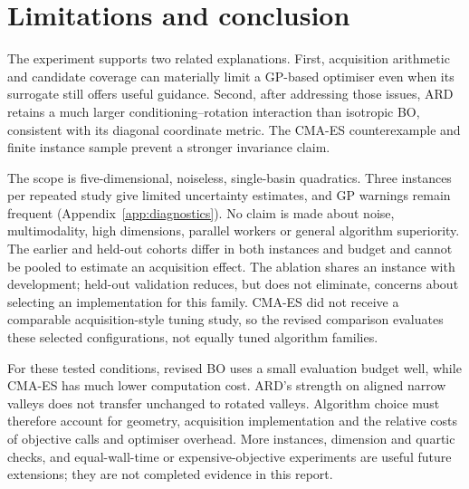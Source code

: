 \documentclass[12pt]{article}
\begin{document}
\section{Limitations and conclusion}
The experiment supports two related explanations. First, acquisition arithmetic
and candidate coverage can materially limit a GP-based optimiser even when
its surrogate still offers useful guidance. Second, after addressing those
issues, ARD retains a much larger conditioning--rotation interaction than
isotropic BO, consistent with its diagonal coordinate metric. The CMA-ES
counterexample and finite instance sample prevent a stronger invariance claim.

The scope is five-dimensional, noiseless, single-basin quadratics. Three
instances per repeated study give limited uncertainty estimates, and GP
warnings remain frequent (Appendix~\ref{app:diagnostics}). No claim is made
about noise, multimodality, high dimensions, parallel workers or general
algorithm superiority. The earlier and held-out cohorts differ in both
instances and budget and cannot be pooled to estimate an acquisition effect.
The ablation shares an instance with development; held-out validation reduces,
but does not eliminate, concerns about selecting an implementation for this family.
CMA-ES did not receive a comparable acquisition-style tuning study, so the
revised comparison evaluates these selected configurations, not equally tuned
algorithm families.

For these tested conditions, revised BO uses a small evaluation budget well,
while CMA-ES has much lower computation cost. ARD's strength on aligned narrow
valleys does not transfer unchanged to rotated valleys. Algorithm choice must
therefore account for geometry, acquisition implementation and the relative
costs of objective calls and optimiser overhead. More instances, dimension and
quartic checks, and equal-wall-time or expensive-objective experiments are useful
future extensions; they are not completed evidence in this report.
\end{document}
